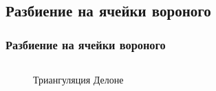 \documentclass[pdf,hyperref={unicode}]{beamer}
\begin{document}
\subsection{Разбиение на ячейки вороного}


\begin{frame}%
\transdissolve[duration=0.2]
\frametitle{Разбиение на ячейки вороного}

\begin{columns}

{
\begin{column}{0.3\linewidth}
\begin{figure}[h]
\caption{Триангуляция Делоне}
\end{figure}
\end{column}
}


\end{columns}
\end{frame}
\end{document}
